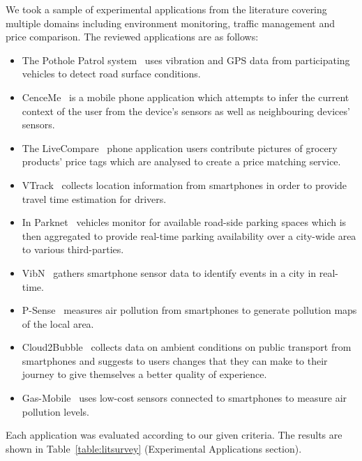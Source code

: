 We took a sample of experimental applications from the literature covering multiple domains including environment monitoring, traffic management and price comparison. The reviewed applications are as follows:
\begin{itemize}
\item The Pothole Patrol system~\citep{Eriksson2008} uses vibration and GPS data from participating vehicles to detect road surface conditions.
\item CenceMe~\citep{Miluzzo2008} is a mobile phone application which attempts to infer the current context of the user from the device's sensors as well as neighbouring devices' sensors.
\item The LiveCompare~\citep{Deng2009} phone application users contribute pictures of grocery products' price tags which are analysed to create a price matching service.
\item VTrack~\citep{Thiagarajan2009} collects location information from smartphones in order to provide travel time estimation for drivers.
\item In Parknet~\citep{Mathur2010} vehicles monitor for available road-side parking spaces which is then aggregated to provide real-time parking availability over a city-wide area to various third-parties.
\item VibN~\citep{Miluzzo2011} gathers smartphone sensor data to identify events in a city in real-time.
\item P-Sense~\citep{Mendez2011} measures air pollution from smartphones to generate pollution maps of the local area.
\item Cloud2Bubble~\citep{Costa2012} collects data on ambient conditions on public transport from smartphones and suggests to users changes that they can make to their journey to give themselves a better quality of experience.
\item Gas-Mobile~\citep{Hasenfratz2012} uses low-cost sensors connected to smartphones to measure air pollution levels.
\end{itemize}
Each application was evaluated according to our given criteria. The results are shown in Table~\ref{table:litsurvey} (Experimental Applications section). 

